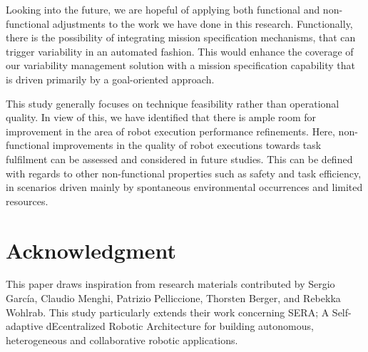 \documentclass[conference]{IEEEtran}
\begin{document}
Looking into the future, we are hopeful of applying both functional and non-functional adjustments to the work we have done in this research. Functionally, there is the possibility of integrating mission specification mechanisms, that can trigger variability in an automated fashion. This would enhance the coverage of our variability management solution with a mission specification capability that is driven primarily by a goal-oriented approach.

This study generally focuses on technique feasibility rather than operational quality. In view of this, we have identified that there is ample room for improvement in the area of robot execution performance refinements. Here, non-functional improvements in the quality of robot executions towards task fulfilment can be assessed and considered in future studies. This can be defined with regards to other non-functional properties such as safety and task efficiency, in scenarios driven mainly by spontaneous environmental occurrences and limited resources.

\section*{Acknowledgment}
This paper draws inspiration from research materials contributed by Sergio Garc\'{i}a, Claudio Menghi, Patrizio Pelliccione, Thorsten Berger, and Rebekka Wohlrab. This study particularly extends their work concerning SERA; A Self-adaptive dEcentralized Robotic Architecture for building autonomous, heterogeneous and collaborative robotic applications.
\end{document}

